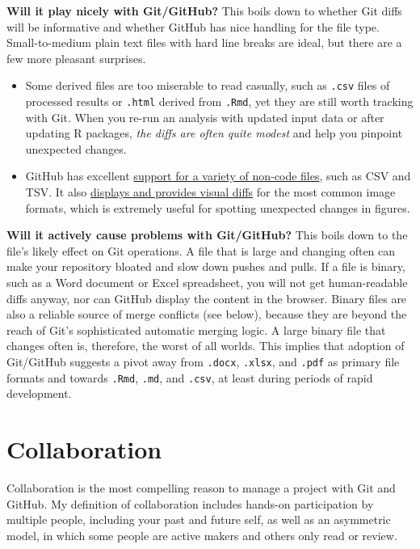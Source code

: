 \documentclass[12pt]{article}
\providecommand{\tightlist}{%
  \setlength{\itemsep}{0pt}\setlength{\parskip}{0pt}}
\begin{document}
\textbf{Will it play nicely with Git/GitHub?} This boils down to whether
Git diffs will be informative and whether GitHub has nice handling for
the file type. Small-to-medium plain text files with hard line breaks
are ideal, but there are a few more pleasant surprises.

\begin{itemize}
\tightlist
\item
  Some derived files are too miserable to read casually, such as
  \texttt{.csv} files of processed results or \texttt{.html} derived
  from \texttt{.Rmd}, yet they are still worth tracking with Git. When
  you re-run an analysis with updated input data or after updating R
  packages, \emph{the diffs are often quite modest} and help you
  pinpoint unexpected changes.
\item
  GitHub has excellent
  \href{https://help.github.com/categories/working-with-non-code-files/}{support
  for a variety of non-code files}, such as CSV and TSV. It also
  \href{https://help.github.com/articles/rendering-and-diffing-images/}{displays
  and provides visual diffs} for the most common image formats, which is
  extremely useful for spotting unexpected changes in figures.
\end{itemize}

\textbf{Will it actively cause problems with Git/GitHub?} This boils
down to the file's likely effect on Git operations. A file that is large
and changing often can make your repository bloated and slow down pushes
and pulls. If a file is binary, such as a Word document or Excel
spreadsheet, you will not get human-readable diffs anyway, nor can
GitHub display the content in the browser. Binary files are also a
reliable source of merge conflicts (see below), because they are beyond
the reach of Git's sophisticated automatic merging logic. A large binary
file that changes often is, therefore, the worst of all worlds. This
implies that adoption of Git/GitHub suggests a pivot away from
\texttt{.docx}, \texttt{.xlsx}, and \texttt{.pdf} as primary file
formats and towards \texttt{.Rmd}, \texttt{.md}, and \texttt{.csv}, at
least during periods of rapid development.

\section{Collaboration}\label{collaboration}

Collaboration is the most compelling reason to manage a project with Git
and GitHub. My definition of collaboration includes hands-on
participation by multiple people, including your past and future self,
as well as an asymmetric model, in which some people are active makers
and others only read or review.
\end{document}
